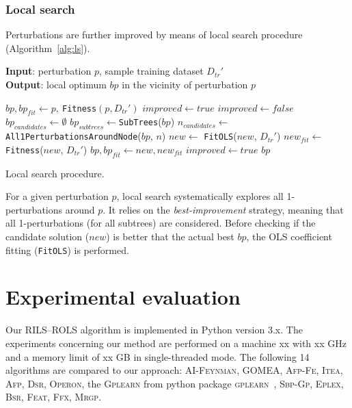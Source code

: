 \documentclass[a4paper,12pt]{elsarticle}
\begin{document}
\subsubsection{Local search}\label{sec:ls}

Perturbations are further improved by means of local search procedure (Algorithm~\ref{alg:ls}). 

\begin{algorithm}
	\hspace*{\algorithmicindent} \textbf{Input}: perturbation $p$, sample training dataset $D_{tr}'$ \\
	\hspace*{\algorithmicindent} \textbf{Output}: local optimum $bp$ in the vicinity of perturbation $p$
	\begin{algorithmic}[1] 
		\State $bp, bp_{fit} \gets p,\ $\texttt{Fitness}$(p,D_{tr}')$ 
		\State $improved \gets true$
		\State $improved \gets false$
		\State $bp_{candidates} \gets \emptyset$
		\State $bp_{subtrees} \gets $\texttt{SubTrees}($bp$)
		\State $n_{candidates} \gets $ \texttt{All1PerturbationsAroundNode}($bp$, $n$)
		\State $new \gets$ \texttt{FitOLS}($new$, $D_{tr}'$)
		\State $new_{fit} \gets$ \texttt{Fitness}($new$, $D_{tr}'$)
		\State $bp, bp_{fit} \gets new, new_{fit}$
		\State $improved \gets true$
		\EndIf
		\EndFor
		\EndFor
		\EndWhile
		\State \Return $bp$
		\EndProcedure
	\end{algorithmic}
	\caption{Local search procedure.}
	\label{alg:ls}
\end{algorithm}  

For a given perturbation $p$, local search systematically explores all 1-perturbations around $p$. It relies on the \emph{best-improvement} strategy, meaning that all 1-perturbations (for all subtrees) are considered. Before checking if the candidate solution ($new$) is better that the actual best $bp$, the OLS coefficient fitting (\texttt{FitOLS}) is performed.  


\section{Experimental evaluation}\label{sec:experiments}

Our \textsc{RILS}--\textsc{ROLS} algorithm is implemented in Python version 3.x. The experiments concerning our method are performed on a machine xx with xx GHz and a memory limit of xx GB in single-threaded mode.  
The following 14 algorithms are compared to our approach: \textsc{AI-Feynman}, \textsc{GOMEA}, \textsc{Afp-Fe}, \textsc{Itea}, \textsc{Afp}, \textsc{Dsr}, \textsc{Operon}, the \textsc{Gplearn} from python package \textsc{gplearn}~\cite{stephens2016genetic}, \textsc{Sbp-Gp}, \textsc{Eplex}, \textsc{Bsr}, \textsc{Feat}, \textsc{Ffx}, \textsc{Mrgp}. 
\end{document}
